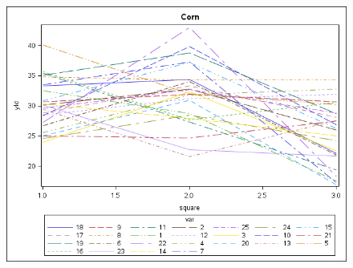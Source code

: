 \documentclass{article}
\def\beginmyfig{\begin{figure}[htbp]\begin{center}}
\def\endmyfig{\end{center}\end{figure}}
\begin{document}
\beginmyfig
  \includegraphics{../SGPlot.png}
\endmyfig
\end{document}
